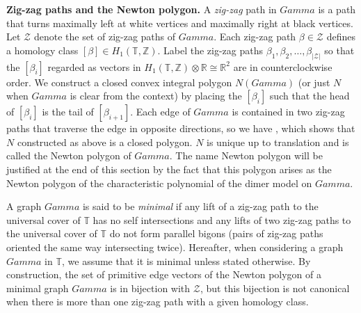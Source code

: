 \documentclass[10pt,a4paper]{amsart}
\numberwithin{equation}{section}
\newcommand{\Z}{{\mathbb Z}}
\newcommand{\R}{{\mathbb R}}
\newcommand{\T}{{\mathbb T}}
\def\Gamma{Gamma}
\begin{document}
{\bf Zig-zag paths and the Newton polygon.}
	A \emph{zig-zag} path in $\Gamma$ is a path that turns maximally left at white vertices and maximally right at black vertices. Let $\mathcal Z$ denote the set of zig-zag paths of $\Gamma$. Each zig-zag path $\beta \in \mathcal Z$ defines a homology class $[\beta]\in H_1(\T,\Z)$. Label the zig-zag paths $\beta_1, \beta_2,\dots,\beta_{|\mathcal Z|}$ so that the $[\beta_i]$ regarded as vectors in $H_1(\T,\Z) \otimes \R \cong \R^2$ are in counterclockwise order. We construct a closed convex integral polygon $N(\Gamma)$ (or just $N$ when $\Gamma$ is clear from the context) by placing the $[\beta_i]$ such that the head of $[\beta_i]$ is the tail of $[\beta_{i+1}]$. Each edge of $\Gamma$ is contained in two zig-zag paths that traverse the edge in opposite directions, so we have , which shows that $N$ constructed as above is a closed polygon. $N$ is unique up to translation and is called the Newton polygon of $\Gamma$. The name Newton polygon will be justified at the end of this section by the fact that this polygon arises as the Newton polygon of the characteristic polynomial of the dimer model on $\Gamma$.
	
A graph $\Gamma$ is said to be \emph{minimal} if any lift of a zig-zag path to the universal cover of $\T$ has no self intersections and any lifts of two zig-zag paths to the universal cover of $\T$ do not form parallel bigons (pairs of zig-zag paths oriented the same way intersecting twice). Hereafter, when considering a graph $\Gamma$ in $\T$, we assume that it is minimal unless stated otherwise. By construction, the set of primitive edge vectors of the Newton polygon of a minimal graph $\Gamma$ is in bijection with $\mathcal Z$, but this bijection is not canonical when there is more than one zig-zag path with a given homology class.
	
	
	
	
	
\end{document}
